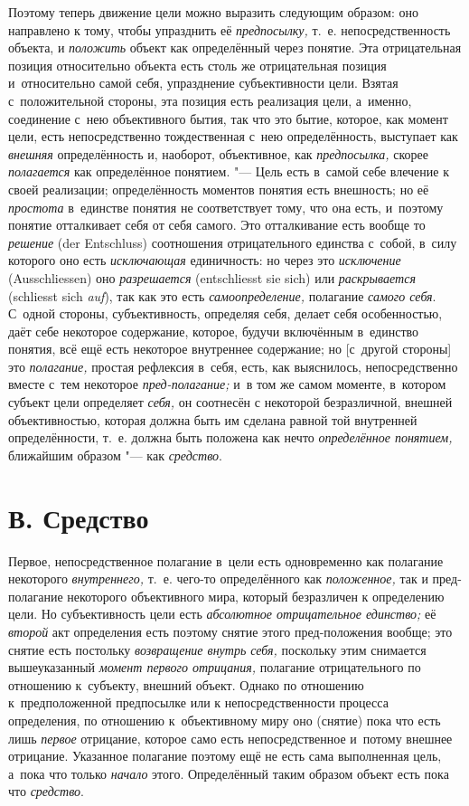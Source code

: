 Поэтому теперь движение цели можно выразить следующим образом: оно направлено
к тому, чтобы упразднить её {\em предпосылку,} т.~е. непосредственность
объекта, и {\em положить} объект как
определённый через понятие. Эта отрицательная позиция относительно объекта
есть столь же отрицательная позиция и~относительно самой себя, упразднение
субъективности цели. Взятая с~положительной стороны, эта позиция есть
реализация цели, а~именно, соединение с~нею объективного бытия, так что это
бытие, которое, как момент цели, есть непосредственно тождественная с~нею
определённость, выступает как {\em внешняя}
определённость и, наоборот, объективное, как
{\em предпосылка,} скорее {\em полагается} как
определённое понятием. "--- Цель есть в~самой себе влечение к
своей реализации; определённость моментов понятия есть внешность; но её
{\em простота} в~единстве
понятия не соответствует тому, что она есть, и~поэтому понятие отталкивает
себя от себя самого. Это отталкивание есть вообще то
{\em решение} (der Entschluss)
соотношения отрицательного единства с~собой, в~силу которого
оно есть {\em исключающая} единичность: но через это
{\em исключение} (Aus\-schliessen) оно {\em разрешается}
(ent\-schliesst sie sich) или {\em раскрывается} (schliesst sich
{\em auf}), так как это есть {\em самоопределение,} полагание {\em самого
себя}. С~одной стороны, субъективность, определяя себя,
делает себя особенностью, даёт себе некоторое содержание, которое, будучи
включённым в~единство понятия, всё ещё есть некоторое внутреннее
содержание; но [с~другой стороны] это {\em полагание,} простая
рефлексия в~себя, есть, как выяснилось, непосредственно вместе с~тем
некоторое {\em пред-полагание;} и~в том же самом моменте, в~котором субъект
цели определяет {\em себя,} он соотнесён
с некоторой безразличной, внешней объективностью, которая должна быть им
сделана равной той внутренней определённости, т.~е. должна быть положена как
нечто {\em определённое понятием,} ближайшим образом "--- как {\em средство}.

\section[В. Средство]{В. Средство}

Первое, непосредственное полагание в~цели есть одновременно
как полагание некоторого {\em внутреннего,} т.~е.
чего-то определённого как {\em положенное,} так и
пред-полагание некоторого объективного мира, который безразличен к
определению цели. Но субъективность цели есть
{\em абсолютное отрицательное единство;} её {\em второй} акт
определения есть поэтому снятие этого пред-положения вообще; это
снятие есть постольку {\em возвращение внутрь себя,}
поскольку этим снимается вышеуказанный {\em момент первого отрицания,}
полагание отрицательного по отношению к~субъекту, внешний
объект. Однако по отношению к~предположенной предпосылке или к
непосредственности процесса определения, по отношению к~объективному миру
оно (снятие) пока что есть лишь {\em первое} отрицание, которое само есть
непосредственное и~потому внешнее отрицание. Указанное полагание поэтому ещё
не есть сама выполненная цель, а~пока что только {\em начало} этого.
Определённый таким образом объект есть пока что {\em средство}.

